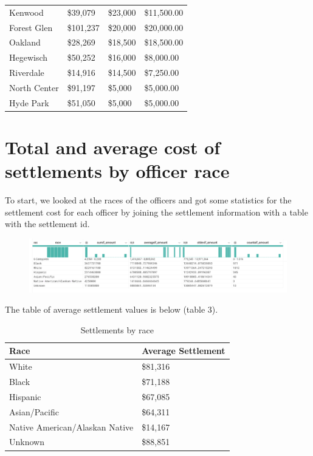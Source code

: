 \documentclass{article}
\begin{document}
\begin{table}[h!]
\begin{tabular}{|l|l|l|l|}
Kenwood                & \$39,079       & \$23,000          & \$11,500.00     \\
Forest Glen            & \$101,237      & \$20,000          & \$20,000.00     \\
Oakland                & \$28,269       & \$18,500          & \$18,500.00     \\
Hegewisch              & \$50,252       & \$16,000          & \$8,000.00      \\
Riverdale              & \$14,916       & \$14,500          & \$7,250.00      \\
North Center           & \$91,197       & \$5,000           & \$5,000.00      \\
Hyde Park              & \$51,050       & \$5,000           & \$5,000.00     \\
\hline
\end{tabular}
\end{table}


\FloatBarrier
\pagebreak

\newpage


\section{Total and average cost of settlements by officer race}

To start, we looked at the races of the officers and got some statistics for the settlement cost for each officer by joining the settlement information with a table with the settlement id.

\begin{figure}[h!]
\includegraphics[width=\textwidth]{RaceTable.PNG}
\end{figure}

The table of average settlement values is below (table 3).


\begin{table}[h!]
\centering
\caption{Settlements by race}
\label{table3}
\begin{tabular}{|l|l|}
\hline
Race	& Average Settlement\\
\hline
White                          & \$81,316  \\
Black                          & \$71,188  \\
Hispanic                       & \$67,085 \\
Asian/Pacific                  & \$64,311  \\
Native American/Alaskan Native & \$14,167  \\
Unknown                        & \$88,851 \\
\hline
\end{tabular}
\end{table}
\end{document}
